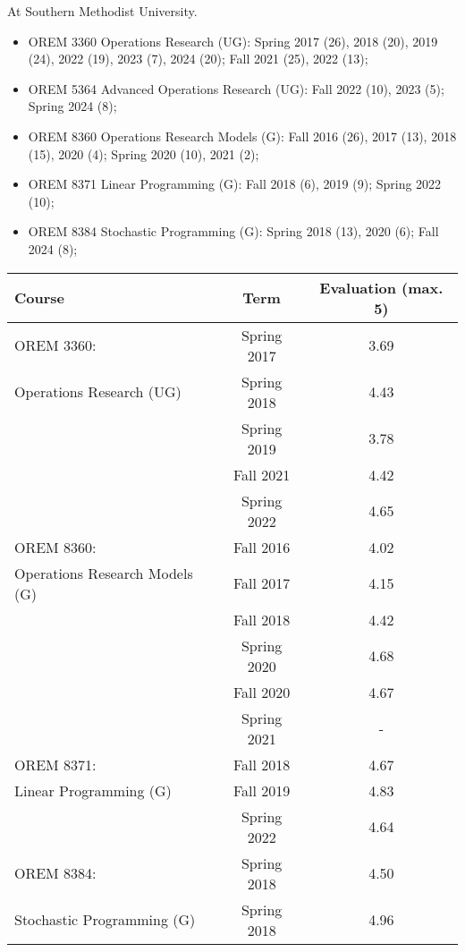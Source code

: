 \documentclass[hyperref, margin]{myResume}
\newif\ifpublic
\begin{document}
\begin{resume}
	At Southern Methodist University.
	\ifpublic
	\begin{itemize}
		\item OREM 3360 Operations Research (UG): Spring 2017 (26), 2018 (20), 2019 (24), 2022 (19), 2023 (7), 2024 (20); Fall 2021 (25), 2022 (13);
		\item OREM 5364 Advanced Operations Research (UG): Fall 2022 (10), 2023 (5); Spring 2024 (8);
		\item OREM 8360 Operations Research Models (G): Fall 2016 (26), 2017 (13), 2018 (15), 2020 (4); Spring 2020 (10), 2021 (2);
		\item OREM 8371 Linear Programming (G): Fall 2018 (6), 2019 (9); Spring 2022 (10);
		\item OREM 8384 Stochastic Programming (G): Spring 2018 (13), 2020 (6); Fall 2024 (8);
	\end{itemize}
	\else 	
	\begin{center}
		\renewcommand{\arraystretch}{1.3}
		\centering \begin{tabular}{|p{}|c|c|}
		\hline 
		Course & Term & Evaluation (max. 5) 	\\ \hline
		OREM 3360: 									& Spring 2017 	& 3.69 \\ \cline{2-3}
		Operations Research (UG)					& Spring 2018 	& 4.43 \\ \cline{2-3}
													& Spring 2019 	& 3.78 \\ \cline{2-3} 
													& Fall 2021		& 4.42 \\ \cline{2-3}
													& Spring 2022	& 4.65 \\ \hline
		OREM 8360: 									& Fall 2016 	& 4.02 \\ \cline{2-3}
		Operations Research Models (G)				& Fall 2017 	& 4.15 \\ \cline{2-3}
													& Fall 2018 	& 4.42 \\ \cline{2-3}
													& Spring 2020 	& 4.68 \\ \cline{2-3}
													& Fall 2020 	& 4.67 \\ \cline{2-3}
													& Spring 2021 	& - \\ \hline
		OREM 8371: 									& Fall 2018 	& 4.67 \\ \cline{2-3}
		Linear Programming (G)						& Fall 2019 	& 4.83 \\ \cline{2-3}
													& Spring 2022 	& 4.64 \\ \hline
		OREM 8384:									& Spring 2018 	& 4.50 \\ \cline{2-3}
		Stochastic Programming (G)					& Spring 2018 	& 4.96 \\ \hline
		\end{tabular}
	\end{center}
	

\end{resume}
\end{document}
